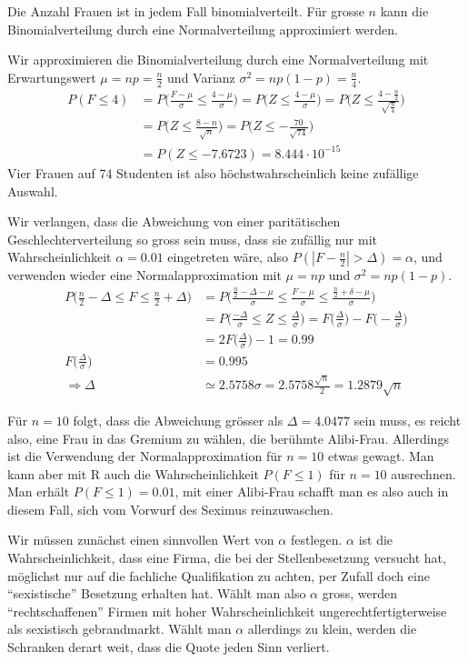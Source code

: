 \begin{loesung}
Die Anzahl Frauen ist in jedem Fall binomialverteilt.
Für grosse $n$ kann die Binomialverteilung durch eine Normalverteilung
approximiert werden.
\begin{teilaufgaben}
\item
Wir approximieren die Binomialverteilung durch eine Normalverteilung
mit Erwartungswert $\mu=np=\frac{n}2$ und Varianz $\sigma^2=np(1-p)=\frac{n}4$.
\begin{align*}
P(F\le 4)
&=
P\biggl( \frac{F-\mu}{\sigma}\le \frac{4-\mu}{\sigma} \biggr)
=
P\biggl( Z\le \frac{4-\mu}{\sigma} \biggr)
=
P\biggl( Z\le \frac{4-\frac{n}2}{\sqrt{\frac{n}4}}\biggr)
\\
&=
P\biggl( Z\le \frac{8-n}{\sqrt{n}}\biggr)
=
P\biggl( Z\le -\frac{70}{\sqrt{74}}\biggr)
\\
&=
P(Z\le -7.6723)= 8.444\cdot 10^{-15}
\end{align*}
Vier Frauen auf 74 Studenten ist also höchstwahrscheinlich keine
zufällige Auswahl.
\item
Wir verlangen, dass die Abweichung von einer paritätischen
Geschlechterverteilung so gross sein muss, dass sie zufällig nur
mit Wahrscheinlichkeit $\alpha = 0.01$ eingetreten wäre, also
$P(|F-\frac{n}2| >\Delta)=\alpha$, und verwenden wieder eine
Normalapproximation mit $\mu=np$ und $\sigma^2=np(1-p)$.
\begin{align*}
P\biggl(\frac{n}2-\Delta\le F\le\frac{n}2+\Delta\biggr)
&=
P\biggl(\frac{\frac{n}2-\Delta-\mu}{\sigma}\le \frac{F-\mu}{\sigma}\le \frac{\frac{n}2+\delta-\mu}{\sigma}\biggr)
\\
&=
P\biggl(
\frac{-\Delta}{\sigma}\le Z\le \frac{\Delta}{\sigma}
\biggr)
=
F\biggl(\frac{\Delta}{\sigma}\biggr)
-
F\biggl(-\frac{\Delta}{\sigma}\biggr)
\\
&=
2F\biggl(\frac{\Delta}{\sigma}\biggr)-1=0.99
\\
F\biggl(\frac{\Delta}{\sigma}\biggr)&=0.995\\
\Rightarrow \Delta&\simeq 2.5758\sigma=2.5758\frac{ \sqrt{n}}2=1.2879\sqrt{n}
\end{align*}
\item
Für $n=10$ folgt, dass die Abweichung grösser als $\Delta = 4.0477$ sein
muss, es reicht also, eine Frau in das Gremium zu wählen, die berühmte
Alibi-Frau. Allerdings ist die Verwendung der Normalapproximation für
$n=10$ etwas gewagt. Man kann aber mit R auch die Wahrscheinlichkeit
$P(F\le 1)$ für $n=10$ ausrechnen. Man erhält $P(F\le 1)=0.01$, mit
einer Alibi-Frau schafft man es also auch in diesem Fall, sich vom
Vorwurf des Seximus reinzuwaschen.
\item
Wir müssen zunächst einen sinnvollen Wert von $\alpha$ festlegen. $\alpha$
ist die Wahrscheinlichkeit, dass eine Firma, die bei der Stellenbesetzung
versucht hat, möglichst nur auf die fachliche Qualifikation zu achten,
per Zufall doch eine ``sexistische'' Besetzung erhalten hat. Wählt man
also $\alpha$ gross, werden ``rechtschaffenen'' Firmen mit hoher
Wahrscheinlichkeit ungerechtfertigterweise als sexistisch gebrandmarkt.
Wählt man $\alpha$ allerdings zu klein, werden die Schranken derart weit,
dass die Quote jeden Sinn verliert.


\end{teilaufgaben}
\end{loesung}
